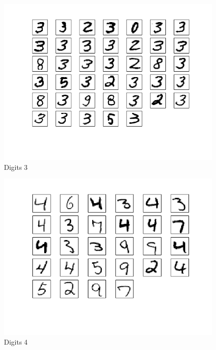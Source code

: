 \documentclass[10pt]{article}
\begin{document}
\begin{figure}
\begin{center}
\includegraphics[scale=0.5]{medoidsA3}
\caption{Digits 3}
\end{center}
\end{figure}
\begin{figure}
\begin{center}
\includegraphics[scale=0.5]{medoidsA4}
\caption{Digits 4}
\end{center}
\end{figure}
\end{document}
